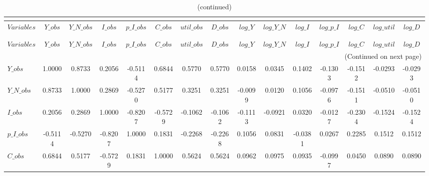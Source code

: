  
\begin{center}
\begin{longtable}{lcccccccccccccc} 
\caption{MATRIX OF CORRELATIONS}\\
 \label{Table:th_corr_matrix}\\
\toprule 
$Variables  $	 & 	 $      Y\_obs$	 & 	 $  Y\_N\_obs$	 & 	 $      I\_obs$	 & 	 $  p\_I\_obs$	 & 	 $      C\_obs$	 & 	 $   util\_obs$	 & 	 $      D\_obs$	 & 	 $      log\_Y$	 & 	 $  log\_Y\_N$	 & 	 $      log\_I$	 & 	 $  log\_p\_I$	 & 	 $      log\_C$	 & 	 $   log\_util$	 & 	 $      log\_D$\\
\midrule \endfirsthead 
\caption{(continued)}\\
 \toprule \\ 
$Variables  $	 & 	 $      Y\_obs$	 & 	 $  Y\_N\_obs$	 & 	 $      I\_obs$	 & 	 $  p\_I\_obs$	 & 	 $      C\_obs$	 & 	 $   util\_obs$	 & 	 $      D\_obs$	 & 	 $      log\_Y$	 & 	 $  log\_Y\_N$	 & 	 $      log\_I$	 & 	 $  log\_p\_I$	 & 	 $      log\_C$	 & 	 $   log\_util$	 & 	 $      log\_D$\\
\midrule \endhead 
\midrule \multicolumn{15}{r}{(Continued on next page)} \\ \bottomrule \endfoot 
\bottomrule \endlastfoot 
$Y\_obs     $	 & 	       1.0000	 & 	       0.8733	 & 	       0.2056	 & 	      -0.5114	 & 	       0.6844	 & 	       0.5770	 & 	       0.5770	 & 	       0.0158	 & 	       0.0345	 & 	       0.1402	 & 	      -0.1303	 & 	      -0.1512	 & 	      -0.0293	 & 	      -0.0293 \\ 
$Y\_N\_obs  $	 & 	       0.8733	 & 	       1.0000	 & 	       0.2869	 & 	      -0.5270	 & 	       0.5177	 & 	       0.3251	 & 	       0.3251	 & 	      -0.0099	 & 	       0.0120	 & 	       0.1056	 & 	      -0.0976	 & 	      -0.1511	 & 	      -0.0510	 & 	      -0.0510 \\ 
$I\_obs     $	 & 	       0.2056	 & 	       0.2869	 & 	       1.0000	 & 	      -0.8207	 & 	      -0.5729	 & 	      -0.1062	 & 	      -0.1062	 & 	      -0.1113	 & 	      -0.0921	 & 	       0.0320	 & 	      -0.0127	 & 	      -0.2304	 & 	      -0.1524	 & 	      -0.1524 \\ 
$p\_I\_obs  $	 & 	      -0.5114	 & 	      -0.5270	 & 	      -0.8207	 & 	       1.0000	 & 	       0.1831	 & 	      -0.2268	 & 	      -0.2268	 & 	       0.1056	 & 	       0.0831	 & 	      -0.0381	 & 	       0.0267	 & 	       0.2285	 & 	       0.1512	 & 	       0.1512 \\ 
$C\_obs     $	 & 	       0.6844	 & 	       0.5177	 & 	      -0.5729	 & 	       0.1831	 & 	       1.0000	 & 	       0.5624	 & 	       0.5624	 & 	       0.0962	 & 	       0.0975	 & 	       0.0935	 & 	      -0.0997	 & 	       0.0450	 & 	       0.0890	 & 	       0.0890 \\ 

\end{longtable}
\end{center}
